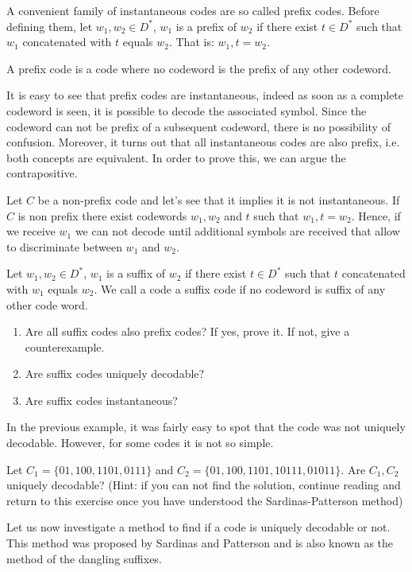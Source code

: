 A convenient family of instantaneous codes are so called prefix codes. Before defining them, let $w_1,w_2\in D^*$, $w_1$ is a prefix of $w_2$ if there exist $t\in D^*$ such that $w_1$ concatenated with $t$ equals $w_2$. That is: $w_1,t=w_2$.
\begin{definition}
A prefix code is a code where no codeword is the prefix of any other codeword.
\end{definition}
It is easy to see that prefix codes are instantaneous, indeed as soon as a complete codeword is seen, it is possible to decode the associated symbol. Since the codeword can not be prefix of a subsequent codeword, there is no possibility of confusion. Moreover, it turns out that all instantaneous codes are also prefix, i.e. both concepts are equivalent. In order to prove this, we can argue the contrapositive. 

Let $C$ be a non-prefix code and let's see that it implies it is not instantaneous. If $C$ is non prefix there exist codewords $w_1,w_2$ and $t$ such that $w_1,t=w_2$. Hence, if we receive $w_1$ we can not decode until additional symbols are received that allow to discriminate between $w_1$ and $w_2$.

\begin{exercise}
Let $w_1,w_2\in D^*$, $w_1$ is a suffix of $w_2$ if there exist $t\in D^*$ such that $t$ concatenated with $w_1$ equals $w_2$. We call a code a suffix code if no codeword is suffix of any other code word.
\begin{enumerate}
\item Are all suffix codes also prefix codes? If yes, prove it. If not, give a counterexample.
\item Are suffix codes uniquely decodable?
\item Are suffix codes instantaneous?
\end{enumerate}
\end{exercise}
In the previous example, it was fairly easy to spot that the code was not uniquely decodable. However, for some codes it is not so simple.
\begin{exercise}\label{ex:sardinas}
Let $C_1=\{01,100,1101,0111\}$ and $C_2=\{01,100,1101,10111,01011\}$. Are $C_1,C_2$ uniquely decodable? (Hint: if you can not find the solution, continue reading and return to this exercise once you have understood the Sardinas-Patterson method)
\end{exercise}

Let us now investigate a method to find if a code is uniquely decodable or not. This method was proposed by Sardinas and Patterson \cite{sardinas1953necessary} and is also known as the method of the dangling suffixes. 

